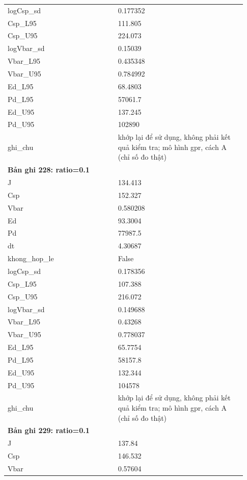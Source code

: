 \begin{longtable}{p{0.43\linewidth}p{0.50\linewidth}}
logCsp\_\allowbreak sd & 0.177352 \\
Csp\_\allowbreak L95 & 111.805 \\
Csp\_\allowbreak U95 & 224.073 \\
logVbar\_\allowbreak sd & 0.15039 \\
Vbar\_\allowbreak L95 & 0.435348 \\
Vbar\_\allowbreak U95 & 0.784992 \\
Ed\_\allowbreak L95 & 68.4803 \\
Pd\_\allowbreak L95 & 57061.7 \\
Ed\_\allowbreak U95 & 137.245 \\
Pd\_\allowbreak U95 & 102890 \\
ghi\_\allowbreak chu & khớp lại để sử dụng, không phải kết quả kiểm tra; mô hình gpr, cách A (chỉ số đo thật) \\
\midrule
\multicolumn{2}{p{0.95\linewidth}}{\textbf{Bản ghi 228: ratio=0.1}} \\
J & 134.413 \\
Csp & 152.327 \\
Vbar & 0.580208 \\
Ed & 93.3004 \\
Pd & 77987.5 \\
dt & 4.30687 \\
khong\_\allowbreak hop\_\allowbreak le & False \\
logCsp\_\allowbreak sd & 0.178356 \\
Csp\_\allowbreak L95 & 107.388 \\
Csp\_\allowbreak U95 & 216.072 \\
logVbar\_\allowbreak sd & 0.149688 \\
Vbar\_\allowbreak L95 & 0.43268 \\
Vbar\_\allowbreak U95 & 0.778037 \\
Ed\_\allowbreak L95 & 65.7754 \\
Pd\_\allowbreak L95 & 58157.8 \\
Ed\_\allowbreak U95 & 132.344 \\
Pd\_\allowbreak U95 & 104578 \\
ghi\_\allowbreak chu & khớp lại để sử dụng, không phải kết quả kiểm tra; mô hình gpr, cách A (chỉ số đo thật) \\
\midrule
\multicolumn{2}{p{0.95\linewidth}}{\textbf{Bản ghi 229: ratio=0.1}} \\
J & 137.84 \\
Csp & 146.532 \\
Vbar & 0.57604 \\

\end{longtable}
